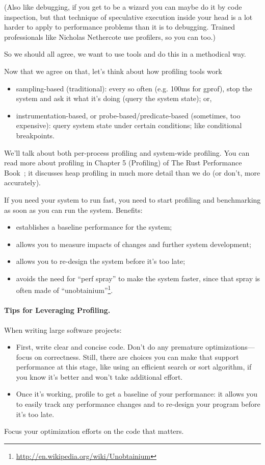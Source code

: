 \documentclass[a4paper]{report}
\begin{document}
(Also like debugging, if you get to be a wizard you can maybe do it by code inspection, but that technique of speculative execution inside your head is a lot harder to apply to performance problems than it is to debugging. Trained professionals like Nicholas Nethercote use profilers, so you can too.)

So we should all agree, we want to use tools and do this in a methodical way.

Now that we agree on that, let's think about how profiling tools work\:

\begin{itemize}[noitemsep]
\item sampling-based (traditional): every so often (e.g. 100ms for gprof), stop the system and ask it what it's doing (query the system state); or,
\item instrumentation-based, or probe-based/predicate-based
  (sometimes, too expensive): query system state under certain
  conditions; like conditional breakpoints.
\end{itemize}
We'll talk about both per-process profiling and system-wide profiling. You can read more about profiling in Chapter 5 (Profiling) of The Rust Performance Book~\cite{nethercote20:_rust_perfor_book}; it discusses heap profiling in much more detail than we do (or don't,
more accurately).

If you need your system to run fast, you need to start profiling
and benchmarking as soon as you can run the system. Benefits:
\begin{itemize}[noitemsep]
\item establishes a baseline performance for the system;
\item allows you to measure impacts of changes and further system development;
\item allows you to re-design the system before it's too late;
\item avoids the need for ``perf spray'' to make the system faster, since
that spray is often made of ``unobtainium''\footnote{\url{http://en.wikipedia.org/wiki/Unobtainium}}.
\end{itemize}

\paragraph{Tips for Leveraging Profiling.}
When writing large software projects:
  \begin{itemize}[noitemsep]
    \item First, write clear and concise code. Don't do any premature optimizations---focus on correctness. Still, there are choices you can make that support performance at this stage, like using an efficient search or sort algorithm, if you know it's better and won't take additional effort.
    \item Once it's working, profile to get a baseline of your performance: it allows you to easily track any performance changes and to re-design your program before it's too late.
  \end{itemize}
Focus your optimization efforts on the code that matters.
\end{document}
